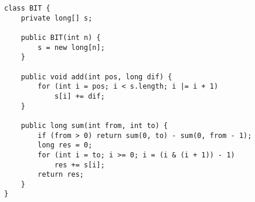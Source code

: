 \begin{verbatim}
class BIT {
	private long[] s;

	public BIT(int n) {
		s = new long[n];
	}

	public void add(int pos, long dif) {
		for (int i = pos; i < s.length; i |= i + 1)
			s[i] += dif;
	}

	public long sum(int from, int to) {
		if (from > 0) return sum(0, to) - sum(0, from - 1);
		long res = 0;
		for (int i = to; i >= 0; i = (i & (i + 1)) - 1)
			res += s[i];
		return res;
	}
}
\end{verbatim}
